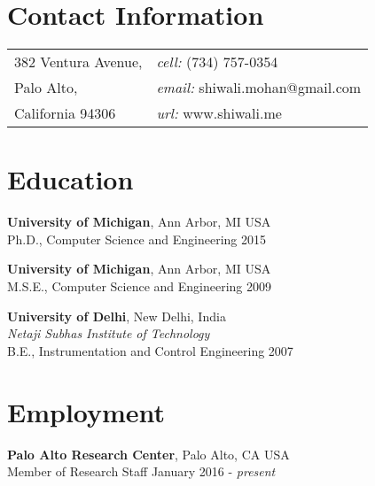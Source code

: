 \documentclass[margin,line,11pt]{res}
\begin{document}

\thispagestyle{empty}
\begin{resume}
  \section{\sc Contact Information}
  \vspace{.05in}
  \begin{tabular}{@{}p{3in}p{4in}}            
    382 Ventura Avenue,                  & {\it cell:}    (734) 757-0354 \\         
    Palo Alto,                            & {\it email:}  shiwali.mohan@gmail.com\\       
    California 94306                          & {\it url:} www.shiwali.me \\     
  \end{tabular}



  \section{\sc Education}
          {\bf University of Michigan}, Ann Arbor, MI USA\\
          Ph.D., Computer Science and Engineering \hfill 2015 

          {\bf University of Michigan}, Ann Arbor, MI USA\\
          M.S.E., Computer Science and Engineering \hfill 2009

          {\bf University of Delhi}, New Delhi, India\\
          {\em Netaji Subhas Institute of Technology}\\
          B.E.,  Instrumentation and Control Engineering \hfill 2007
  
\section{\sc Employment}
          {\bf Palo Alto Research Center}, Palo Alto, CA USA \\
          {Member of Research Staff}  \hfill January 2016 - \emph{present}
                  

\end{resume}
\end{document}
